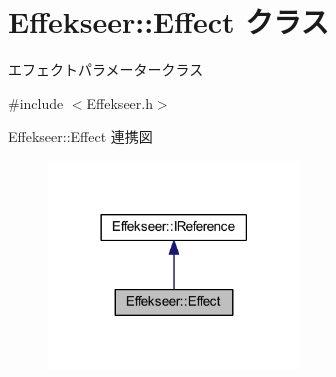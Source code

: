 \hypertarget{class_effekseer_1_1_effect}{}\section{Effekseer\+:\+:Effect クラス}
\label{class_effekseer_1_1_effect}


エフェクトパラメータークラス  




{\ttfamily \#include $<$Effekseer.\+h$>$}



Effekseer\+:\+:Effect 連携図\nopagebreak
\begin{figure}[H]
\begin{center}
\leavevmode
\includegraphics[width=189pt]{class_effekseer_1_1_effect__coll__graph}
\end{center}
\end{figure}
